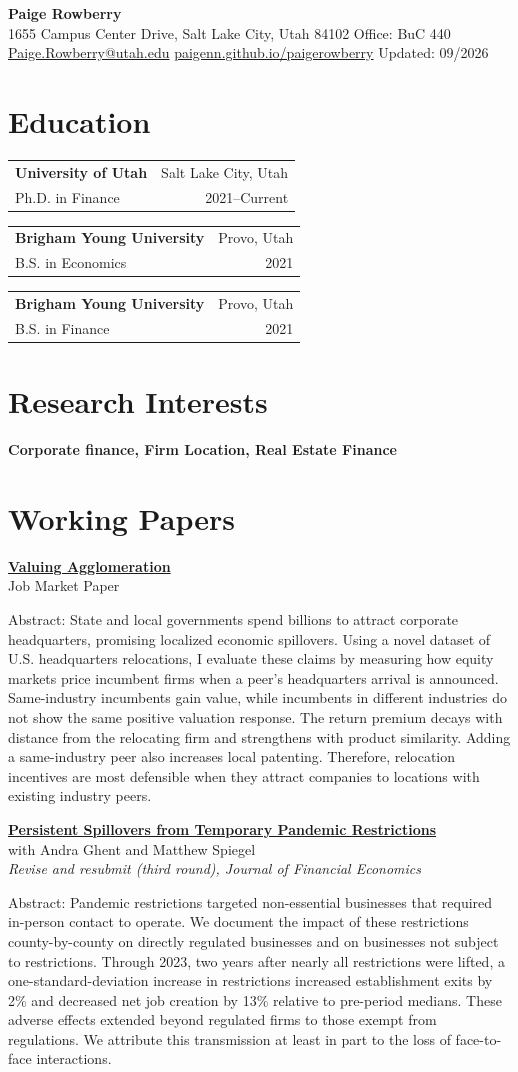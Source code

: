 \documentclass[11pt]{article}
\makeatletter
\newcommand{\eduentry}[4]{%
\begin{tabular*}{\textwidth}{@{}l@{\extracolsep{\fill}}r@{}}
\textbf{#1} & #2 \\
#3 & #4 \\
\end{tabular*}\vspace{0.6em}
}
\newcommand{\cvsection}[2][12]{%
\Needspace{#1\baselineskip}%
\section*{#2}%
}
\newenvironment{paperentry}{%
\samepage
}{%
\vspace{0.6em}%
\par
}
\makeatother
\begin{document}
\pagestyle{plain}

\begin{center}
{\LARGE \textbf{Paige Rowberry}}\\[0.3em]
1655 Campus Center Drive, Salt Lake City, Utah 84102 \textbar{} Office: BuC 440\\
\href{mailto:Paige.Rowberry@utah.edu}{Paige.Rowberry@utah.edu} \textbar{}
\href{https://paigenn.github.io/paigerowberry/}{paigenn.github.io/paigerowberry} \textbar{} Updated: 09/2026
\end{center}

\cvsection{Education}
\eduentry{University of Utah}{Salt Lake City, Utah}{Ph.D. in Finance}{2021--Current}
\eduentry{Brigham Young University}{Provo, Utah}{B.S. in Economics}{2021}
\eduentry{Brigham Young University}{Provo, Utah}{B.S. in Finance}{2021}

\cvsection{Research Interests}
\textbf{Corporate finance, Firm Location, Real Estate Finance}

\cvsection{Working Papers}
\begin{paperentry}
\textbf{\href{https://papers.ssrn.com/sol3/papers.cfm?abstract_id=5258696}{Valuing Agglomeration}}\\
Job Market Paper

Abstract: State and local governments spend billions to attract corporate headquarters, promising localized economic spillovers. Using a novel dataset of U.S. headquarters relocations, I evaluate these claims by measuring how equity markets price incumbent firms when a peer's headquarters arrival is announced. Same-industry incumbents gain value, while incumbents in different industries do not show the same positive valuation response. The return premium decays with distance from the relocating firm and strengthens with product similarity. Adding a same-industry peer also increases local patenting. Therefore, relocation incentives are most defensible when they attract companies to locations with existing industry peers.
\end{paperentry}

\begin{paperentry}
\textbf{\href{https://papers.ssrn.com/sol3/papers.cfm?abstract_id=4834348}{Persistent Spillovers from Temporary Pandemic Restrictions}}\\
with Andra Ghent and Matthew Spiegel\\
\emph{Revise and resubmit (third round), Journal of Financial Economics}

Abstract: Pandemic restrictions targeted non-essential businesses that required in-person contact to operate. We document the impact of these restrictions county-by-county on directly regulated businesses and on businesses not subject to restrictions. Through 2023, two years after nearly all restrictions were lifted, a one-standard-deviation increase in restrictions increased establishment exits by 2\% and decreased net job creation by 13\% relative to pre-period medians. These adverse effects extended beyond regulated firms to those exempt from regulations. We attribute this transmission at least in part to the loss of face-to-face interactions.
\end{paperentry}
\end{document}

